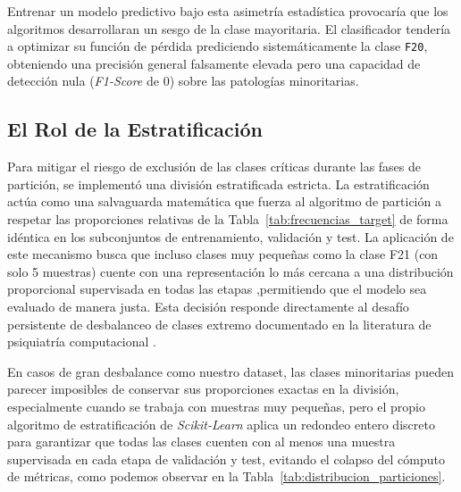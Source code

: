 \documentclass[12pt,a4paper,onecolumn,oneside]{report}
\begin{document}
Entrenar un modelo predictivo bajo esta asimetría estadística provocaría que los algoritmos desarrollaran un sesgo de la clase mayoritaria. El clasificador tendería a optimizar su función de pérdida prediciendo sistemáticamente la clase \texttt{F20}, obteniendo una precisión general falsamente elevada pero una capacidad de detección nula (\textit{F1-Score} de $0$) sobre las patologías minoritarias.

\subsection{El Rol de la Estratificación}
Para mitigar el riesgo de exclusión de las clases críticas durante las fases de partición, se implementó una división estratificada estricta. La estratificación actúa como una salvaguarda matemática que fuerza al algoritmo de partición a respetar las proporciones relativas de la Tabla~\ref{tab:frecuencias_target} de forma idéntica en los subconjuntos de entrenamiento, validación y test. La aplicación de este mecanismo busca que incluso clases muy pequeñas como la clase F21 (con solo 5 muestras) cuente con una representación lo más cercana a una distribución proporcional supervisada en todas las etapas ,permitiendo que el modelo sea evaluado de manera justa. Esta decisión responde directamente al desafío persistente de desbalanceo de clases extremo documentado en la literatura de psiquiatría computacional \cite{lai2021schizophrenia}.

En casos de gran desbalance como nuestro dataset, las clases minoritarias pueden parecer imposibles de conservar sus proporciones exactas en la división, especialmente cuando se trabaja con muestras muy pequeñas, pero el propio algoritmo de estratificación de \textit{Scikit-Learn} aplica un redondeo entero discreto para garantizar que todas las clases cuenten con al menos una muestra supervisada en cada etapa de validación y test, evitando el colapso del cómputo de métricas, como podemos observar en la Tabla~\ref{tab:distribucion_particiones}.
\end{document}
